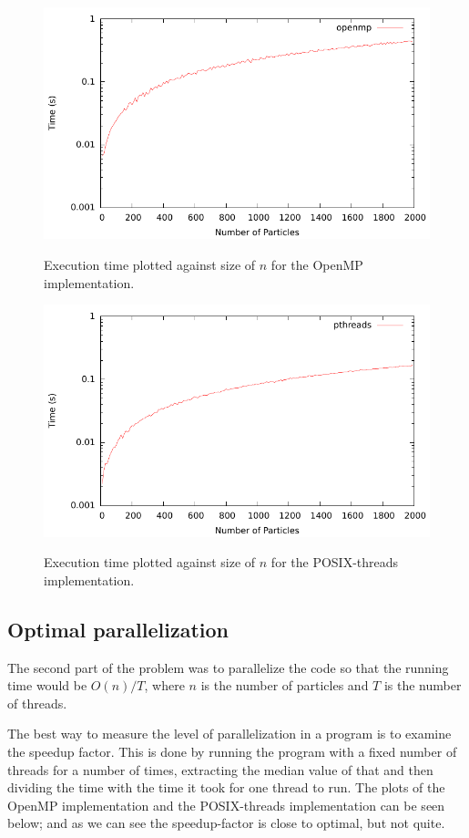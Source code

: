 \begin{figure}[H]
	\includegraphics{plots/openmp.pdf}
	\label{openmp_linear}
	\caption{Execution time plotted against size of $n$ for the OpenMP implementation.}
\end{figure}
\begin{figure}[H]
	\includegraphics{plots/pthreads.pdf}
	\label{pthreads_linear}
	\caption{Execution time plotted against size of $n$ for the POSIX-threads implementation.}
\end{figure}

\subsection{Optimal parallelization}

The second part of the problem was to parallelize the code so that the running
time would be $O(n) / T$, where $n$ is the number of particles and $T$ is the
number of threads.

The best way to measure the level of parallelization in a program is to examine
the speedup factor. This is done by running the program with a fixed number of
threads for a number of times, extracting the median value of that and then
dividing the time with the time it took for one thread to run. The plots of the
OpenMP implementation and the POSIX-threads implementation can be seen below;
and as we can see the speedup-factor is close to optimal, but not quite.

